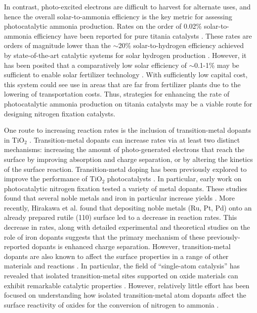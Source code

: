 In contrast, photo-excited electrons are difficult to harvest for alternate uses, and hence the overall solar-to-ammonia efficiency is the key metric for assessing photocatalytic ammonia production. Rates on the order of 0.02\% solar-to-ammonia efficiency have been reported for pure titania catalysts \cite{Hirakawa_2017}. These rates are orders of magnitude lower than the $\sim$20\% solar-to-hydrogen efficiency achieved by state-of-the-art catalytic systems for solar hydrogen production \cite{Nakamura_2015, Jia_2016}. However, it has been posited that a comparatively low solar efficiency of $\sim$0.1-1\% may be sufficient to enable solar fertilizer technology \cite{Comer_2019, Medford_2017}. With sufficiently low capital cost, this system could see use in areas that are far from fertilizer plants due to the lowering of transportation costs. Thus, strategies for enhancing the rate of photocatalytic ammonia production on titania catalysts may be a viable route for designing nitrogen fixation catalysts.

One route to increasing reaction rates is the inclusion of transition\hyp{}metal dopants in TiO$_2$ \cite{Zaleska_2008}.  Transition\hyp{}metal dopants can increase rates via at least two distinct mechanisms: increasing the amount of photo-generated electrons that reach the surface by improving absorption and charge separation, or by altering the kinetics of the surface reaction.
Transition-metal doping has been previously explored to improve the performance of TiO$_2$ photocatalysts \cite{Schneider_2014, Li_2007, Dozzi_2013}. In particular, early work on photocatalytic nitrogen fixation tested a variety of metal dopants. These studies found that several noble metals \cite{Ranjit_1996} and iron in particular increase yields \cite{Schrauzer_1977, Schrauzer_1983, Augugliaro_1982, Soria_1991, Ranjit_1996, Ranjit_1997}. More recently, Hirakawa et al. found that depositing noble metals (Ru, Pt, Pd) onto an already prepared rutile (110) surface led to a decrease in reaction rates.\cite{Hirakawa_2017} This decrease in rates, along with detailed experimental and theoretical studies on the role of iron dopants  \cite{Soria_1991, Comer_2018} suggests that the primary mechanism of these previously-reported dopants is enhanced charge separation. However, transition-metal dopants are also known to affect the surface properties in a range of other materials and reactions \cite{Khan_2018, Gu_2014, Ammal_2016, Gu_2017, Comer_2018, Garc_a_Mota_2011, Yao_2017}. In particular, the field of ``single-atom catalysis'' has revealed that isolated transition-metal sites supported on oxide materials can exhibit remarkable catalytic properties \cite{Liu_2016, Qiao_2011, O_Connor_2018}. However, relatively little effort has been focused on understanding how isolated transition-metal atom dopants affect the surface reactivity of oxides for the conversion of nitrogen to ammonia \cite{Tao_2019, Liu_2019, Zhao_2019, Cheng_2019, Li_2017}.

